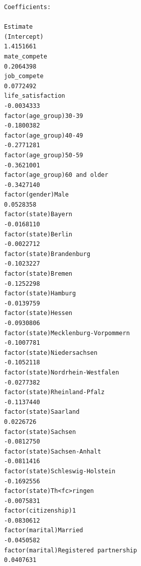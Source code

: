 \documentclass[
]{article}
\begin{document}
\begin{table}
\begin{minipage}[t]{\linewidth}
{\begin{verbatim}
Coefficients:
                                                                                    Estimate
(Intercept)                                                                        1.4151661
mate_compete                                                                       0.2064398
job_compete                                                                        0.0772492
life_satisfaction                                                                 -0.0034333
factor(age_group)30-39                                                            -0.1800382
factor(age_group)40-49                                                            -0.2771281
factor(age_group)50-59                                                            -0.3621001
factor(age_group)60 and older                                                     -0.3427140
factor(gender)Male                                                                 0.0528358
factor(state)Bayern                                                               -0.0168110
factor(state)Berlin                                                               -0.0022712
factor(state)Brandenburg                                                          -0.1023227
factor(state)Bremen                                                               -0.1252298
factor(state)Hamburg                                                              -0.0139759
factor(state)Hessen                                                               -0.0930806
factor(state)Mecklenburg-Vorpommern                                               -0.1007781
factor(state)Niedersachsen                                                        -0.1052118
factor(state)Nordrhein-Westfalen                                                  -0.0277382
factor(state)Rheinland-Pfalz                                                      -0.1137440
factor(state)Saarland                                                              0.0226726
factor(state)Sachsen                                                              -0.0812750
factor(state)Sachsen-Anhalt                                                       -0.0811416
factor(state)Schleswig-Holstein                                                   -0.1692556
factor(state)Th<fc>ringen                                                         -0.0075831
factor(citizenship)1                                                              -0.0830612
factor(marital)Married                                                            -0.0450582
factor(marital)Registered partnership                                              0.0407631

\end{verbatim}}
\end{minipage}
\end{table}
\end{document}
